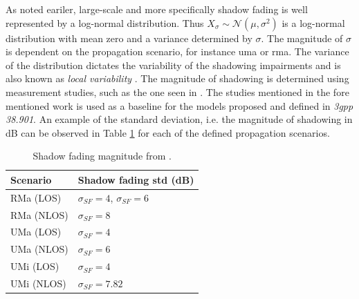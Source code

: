     
As noted eariler, large-scale and more specifically shadow fading is well represented by a log-normal distribution. Thus $X_\sigma \sim \mathcal{N}(\mu, \sigma^2)$ is a log-normal distribution with mean zero and a variance determined by $\sigma$. The magnitude of $\sigma$ is dependent on the propagation scenario, for instance \gls{uma} or \gls{rma}. The variance of the distribution dictates the variability of the shadowing impairments and is also known as \emph{local variability} \cite{Perez-Fontan2008}. The magnitude of shadowing is determined using measurement studies, such as the one seen in \cite{Sun2016}. The studies mentioned in the fore mentioned work is used as a baseline for the models proposed and defined in \textit{\gls{3gpp} 38.901}. An example of the standard deviation, i.e. the magnitude of shadowing in dB can be observed in Table \ref{tab:sigma_SF} for each of the defined propagation scenarios.


\begin{table}[b]
    \centering
    \begin{tabular}{@{}ll@{}}
    \toprule
    Scenario   & Shadow fading std (dB)               \\ \midrule
    RMa (LOS)  & $\sigma_{SF} = 4$, $\sigma_{SF} = 6$ \\
    RMa (NLOS) & $\sigma_{SF} = 8$                    \\
    UMa (LOS)  & $\sigma_{SF} = 4$                    \\
    UMa (NLOS) & $\sigma_{SF} = 6$                    \\
    UMi (LOS)  & $\sigma_{SF} = 4$                    \\
    UMi (NLOS) & $\sigma_{SF} = 7.82$                 \\ \bottomrule
    \end{tabular}
    \caption{Shadow fading magnitude from \cite{3GPP38901}.}\label{tab:sigma_SF}
\end{table}


